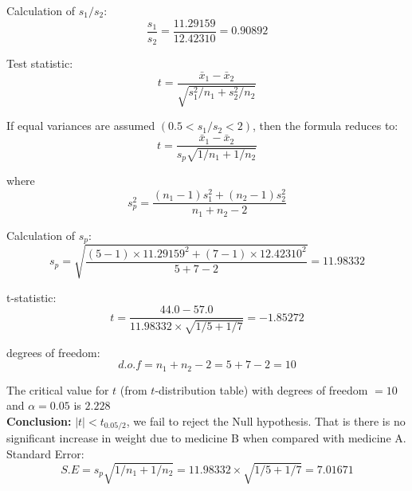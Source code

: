 \documentclass[a4paper,11pt,openright]{report}
\begin{document}
\begin{enumerate}
Calculation of $s_{1}/s_{2}$:
\begin{equation*}
\frac{s_{1}}{s_{2}} = \frac{11.29159}{12.42310} = 0.90892
\end{equation*}

Test statistic:
\begin{equation*}
t = \frac{\bar x_{1} - \bar x_{2}}{\sqrt{s_{1}^{2}/n_{1} + s_{2}^{2}/n_{2}}}
\end{equation*}

If equal variances are assumed $(0.5 < s_{1}/s_{2} < 2)$, then the formula reduces to:
\begin{equation*}
t = \frac{\bar x_{1} - \bar x_{2}}{s_{p} \sqrt{1/n_{1} + 1/n_{2}}}
\end{equation*}

where
\begin{equation*}
s_{p}^{2} = \frac{(n_{1}-1)s_{1}^{2} + (n_{2}-1)s_{2}^{2}}{n_{1}+n_{2}-2}
\end{equation*}

Calculation of $s_{p}$:
\begin{equation*}
s_{p} = \sqrt{\frac{(5-1) \times 11.29159^{2} + (7-1) \times 12.42310^{2}}{5+7-2}} 
      = 11.98332
\end{equation*}

t-statistic:
\begin{equation*}
t = \frac{44.0 - 57.0}{11.98332 \times \sqrt{1/5 + 1/7}} = -1.85272
\end{equation*}

degrees of freedom:
\begin{equation*}
d.o.f = n_{1} + n_{2} -2 = 5 + 7 - 2 = 10
\end{equation*}

The critical value for $t$ (from $t$-distribution table) with degrees of freedom $= 10$ and
$\alpha = 0.05$ is $2.228$ \\

\textbf{Conclusion:} $|t| < t_{0.05/2}$, we fail to reject the Null hypothesis. That is
there is no significant increase in weight due to medicine B when compared with medicine
A.\\

Standard Error:
\begin{equation*}
S.E = s_{p} \sqrt{1/n_{1} + 1/n_{2}} = 11.98332 \times \sqrt{1/5 + 1/7} = 7.01671
\end{equation*}


\end{enumerate}
\end{document}
